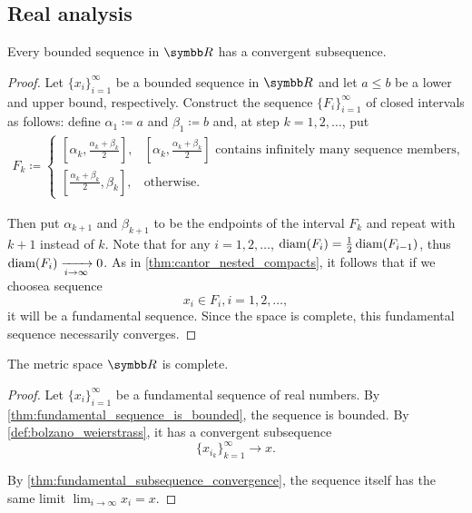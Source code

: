 \subsection{Real analysis}\label{subsec:real_analysis}

\begin{theorem}\label{def:bolzano_weierstrass}
  Every bounded sequence in \( \R \) has a convergent subsequence.
\end{theorem}
\begin{proof}
  Let \( \{ x_i \}_{i=1}^\infty \) be a bounded sequence in \( \R \) and let \( a \leq b \) be a lower and upper bound, respectively. Construct the sequence \( \{ F_i \}_{i=1}^\infty \) of closed intervals as follows: define \( \alpha_1 \coloneqq a \) and \( \beta_1 \coloneqq b \) and, at step \( k = 1, 2, \ldots \), put
  \begin{align*}
    F_k \coloneqq \begin{cases}
      [\alpha_k, \tfrac{\alpha_k+\beta_k} 2], &[\alpha_k, \tfrac{\alpha_k+\beta_k} 2]\text{ contains infinitely many sequence members}, \\
      [\tfrac{\alpha_k+\beta_k} 2, \beta_k], &\text{otherwise}.
    \end{cases}
  \end{align*}

  Then put \( \alpha_{k+1} \) and \( \beta_{k+1} \) to be the endpoints of the interval \( F_k \) and repeat with \( k+1 \) instead of \( k \). Note that for any \( i = 1, 2, \ldots \), \( \operatorname{diam}(F_i) = \tfrac 1 2 \operatorname{diam}(F_{i-1}) \), thus \( \operatorname{diam}(F_i) \xrightarrow[i \to \infty]{} 0 \). As in \cref{thm:cantor_nested_compacts}, it follows that if we choose\AOC a sequence
  \begin{equation*}
    x_i \in F_i, i = 1, 2, \ldots,
  \end{equation*}
  it will be a fundamental sequence. Since the space is complete, this fundamental sequence necessarily converges.
\end{proof}

\begin{theorem}\label{def:real_numbers_complete_metric_space}
  The metric space \( \R \) is complete.
\end{theorem}
\begin{proof}
  Let \( \{ x_i \}_{i=1}^\infty \) be a fundamental sequence of real numbers. By \cref{thm:fundamental_sequence_is_bounded}, the sequence is bounded. By \cref{def:bolzano_weierstrass}, it has a convergent subsequence
  \begin{equation*}
    \{ x_{i_k} \}_{k=1}^\infty \to x.
  \end{equation*}

  By \cref{thm:fundamental_subsequence_convergence}, the sequence itself has the same limit \( \lim_{i \to \infty} x_i = x \).
\end{proof}
